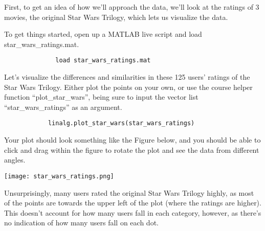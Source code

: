 \documentclass{ximera}
\begin{document}
\begin{exploration}
  \vspace{1em}

  First, to get an idea of how we'll approach the data, we'll look at the ratings of 3 movies, the original Star Wars Trilogy, which lets us visualize the data.

  To get things started, open up a MATLAB live script and load star\_wars\_ratings.mat.

  \begin{remark}
          \begin{verbatim}
              load star_wars_ratings.mat
          \end{verbatim}
  \end{remark}

  Let's visualize the differences and similarities in these 125 users' ratings of the Star Wars Trilogy. Either plot the points on your own, or use the course helper function ``plot\_star\_wars'', being sure to input the vector list ``star\_wars\_ratings'' as an argument.

  \begin{remark}
        \begin{verbatim}
            linalg.plot_star_wars(star_wars_ratings)
        \end{verbatim}
  \end{remark}

  Your plot should look something like the Figure below, and you should be able to click and drag within the figure to rotate the plot and see the data from different angles.

  \begin{center}
    \texttt{[image: star\_wars\_ratings.png]}
  \end{center}

  Unsurprisingly, many users rated the original Star Wars Trilogy highly, as most of the points are towards the upper left of the plot (where the ratings are higher). This doesn't account for how many users fall in each category, however, as there's no indication of how  many users fall on each dot. 

\end{exploration}
\end{document}
